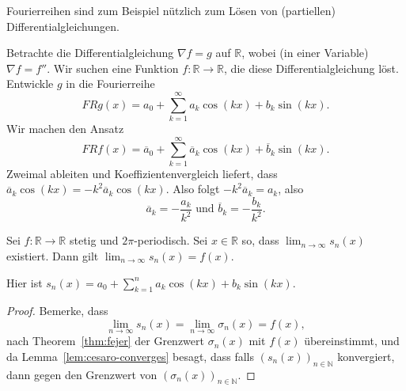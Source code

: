 \documentclass[../main.tex]{subfiles}
\begin{document}
Fourierreihen sind zum Beispiel
nützlich zum Lösen von (partiellen) Differentialgleichungen.

\begin{example}
  Betrachte die Differentialgleichung $\nabla f = g$ auf $\mathbb{R}$,
  wobei (in einer Variable) $\nabla f = f''$.
  Wir suchen eine Funktion $f\colon \mathbb{R} \to \mathbb{R}$, die diese
  Differentialgleichung löst.
  Entwickle $g$ in die Fourierreihe
  \[
    FRg(x) = a_0 + \sum_{k=1}^{\infty} a_k \cos(kx) + b_k \sin(kx).
  \]
  Wir machen den Ansatz
  \[
    FRf(x) = \overline a_0 +
    \sum_{k=1}^{\infty} \overline a_k \cos(kx) + \overline b_k \sin(kx).
  \]
  Zweimal ableiten und Koeffizientenvergleich liefert, dass
  \(
    \overline a_k \cos(kx) = - k^2 \overline a_k \cos(kx).
  \)
  Also folgt
  \(
    -k^2 \overline a_k = a_k
  \),
  also
  \[
    \overline a_k = - \frac{a_k}{k^2} \text{ und } \overline b_k = - \frac{b_k}{k^2}.
  \]
\end{example}

\begin{corollary}
  Sei $f \colon \mathbb{R} \to \mathbb{R}$ stetig und $2\pi$-periodisch.
  Sei $x \in \mathbb{R}$ so, dass
  $\lim_{n \to \infty} s_n(x)$ existiert.
  Dann gilt $\lim_{n \to \infty} s_n(x) = f(x)$.
\end{corollary}

Hier ist
\(
  s_n(x) = a_0 + \sum_{k=1}^{n} a_k \cos(kx) + b_k \sin(kx).
\)

\begin{proof}
  Bemerke, dass
  \[
    \lim_{n \to \infty} s_n(x) = \lim_{n \to \infty} \sigma_n(x) = f(x),
  \]
  nach Theorem~\ref{thm:fejer} der Grenzwert $\sigma_n(x)$ mit $f(x)$ übereinstimmt, und
  da Lemma~\ref{lem:cesaro-converges} besagt, dass falls ${(s_n(x))}_{n \in \mathbb{N}}$
  konvergiert, dann gegen den Grenzwert von ${(\sigma_{n}(x))}_{n \in \mathbb{N}}$.
\end{proof}
\end{document}
